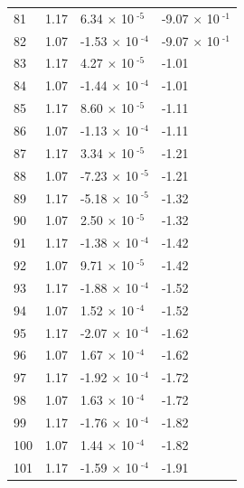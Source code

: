 \documentclass[a4paper,11pt]{article}
\begin{document}
\begin{center}
\begin{longtable}{|R{1.5cm}|R{2.5cm}|R{2.5cm}|R{2.5cm}|}
   81 &   1.17  &         6.34 $\times$ 10$^{\text{          -5}}$  &        -9.07 $\times$ 10$^{\text{          -1}}$ \\ 
   82 &   1.07  &        -1.53 $\times$ 10$^{\text{          -4}}$  &        -9.07 $\times$ 10$^{\text{          -1}}$ \\ 
   83 &   1.17  &         4.27 $\times$ 10$^{\text{          -5}}$  &  -1.01 \\ 
   84 &   1.07  &        -1.44 $\times$ 10$^{\text{          -4}}$  &  -1.01 \\ 
   85 &   1.17  &         8.60 $\times$ 10$^{\text{          -5}}$  &  -1.11 \\ 
   86 &   1.07  &        -1.13 $\times$ 10$^{\text{          -4}}$  &  -1.11 \\ 
   87 &   1.17  &         3.34 $\times$ 10$^{\text{          -5}}$  &  -1.21 \\ 
   88 &   1.07  &        -7.23 $\times$ 10$^{\text{          -5}}$  &  -1.21 \\ 
   89 &   1.17  &        -5.18 $\times$ 10$^{\text{          -5}}$  &  -1.32 \\ 
   90 &   1.07  &         2.50 $\times$ 10$^{\text{          -5}}$  &  -1.32 \\ 
   91 &   1.17  &        -1.38 $\times$ 10$^{\text{          -4}}$  &  -1.42 \\ 
   92 &   1.07  &         9.71 $\times$ 10$^{\text{          -5}}$  &  -1.42 \\ 
   93 &   1.17  &        -1.88 $\times$ 10$^{\text{          -4}}$  &  -1.52 \\ 
   94 &   1.07  &         1.52 $\times$ 10$^{\text{          -4}}$  &  -1.52 \\ 
   95 &   1.17  &        -2.07 $\times$ 10$^{\text{          -4}}$  &  -1.62 \\ 
   96 &   1.07  &         1.67 $\times$ 10$^{\text{          -4}}$  &  -1.62 \\ 
   97 &   1.17  &        -1.92 $\times$ 10$^{\text{          -4}}$  &  -1.72 \\ 
   98 &   1.07  &         1.63 $\times$ 10$^{\text{          -4}}$  &  -1.72 \\ 
   99 &   1.17  &        -1.76 $\times$ 10$^{\text{          -4}}$  &  -1.82 \\ 
  100 &   1.07  &         1.44 $\times$ 10$^{\text{          -4}}$  &  -1.82 \\ 
  101 &   1.17  &        -1.59 $\times$ 10$^{\text{          -4}}$  &  -1.91 \\ 

\end{longtable}
\end{center}
\end{document}
